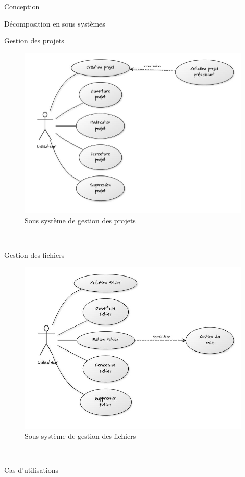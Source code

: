 \documentclass[a4paper, 12pt]{report}
\begin{document}
\begin{part}{Conception}
\begin{chapter}{Décomposition en sous systèmes}
\begin{section}{Gestion des projets}
\begin{figure}[ht]
\begin{center}
						\includegraphics[width=13cm]{images/gestionProjets.jpg}
						\caption{Sous système de gestion des projets}
						\label{ssgp}
					\end{center}
				\end{figure}~\\
			\end{section}
			\newpage
			\begin{section}{Gestion des fichiers}
				\begin{figure}[ht]
				\label{ssgf}
					\begin{center}
						\includegraphics[width=13cm]{images/gestionFichiers.jpg}
						\caption{Sous système de gestion des fichiers}
					\end{center}
				\end{figure}~\\
			\end{section}
		\end{chapter}
		\begin{chapter}{Cas d'utilisations}
		

\end{chapter}
\end{part}
\end{document}
